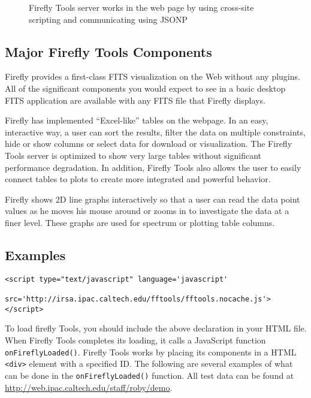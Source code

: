 \begin{figure}[!ht]
\caption{\small Firefly Tools server works in the web page by using cross-site scripting and communicating using JSONP}
\label{server-chart}
\end{figure}


\subsection{Major Firefly Tools Components}

Firefly provides a first-class FITS visualization on the Web without any plugins. All of the significant components you would expect to see in a basic desktop FITS application are available with any FITS file that Firefly displays.

Firefly has implemented “Excel-like” tables on the webpage. In an easy, interactive way, a user can sort the results, filter the data on multiple constraints, hide or show columns or select data for download or visualization. The Firefly Tools server is optimized to show very large tables without significant performance degradation. In addition, Firefly Tools also allows the user to easily connect tables to plots to create more integrated and powerful behavior.

Firefly shows 2D line graphs interactively so that a user can read the data point values as he moves his mouse around or zooms in to investigate the data at a finer level. These graphs are used for spectrum or plotting table columns. 


\subsection{Examples}

\scriptsize
\begin{verbatim}
<script type="text/javascript" language='javascript'
           src='http://irsa.ipac.caltech.edu/fftools/fftools.nocache.js'> </script>
\end{verbatim}
\normalsize
To load firefly Tools, you should include the above declaration in your HTML file. When Firefly Tools completes its loading, it calls a JavaScript function \scriptsize \texttt{onFireflyLoaded()}\normalsize. Firefly Tools works by placing its components in a HTML \scriptsize\texttt{<div>} \normalsize element with a specified ID. The following are several examples of what can be done in the \scriptsize \texttt{onFireflyLoaded()} \normalsize function. All test data can be found at \url{http://web.ipac.caltech.edu/staff/roby/demo}.

